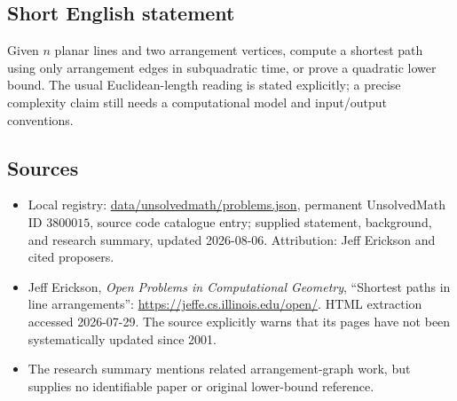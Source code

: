 \documentclass[11pt]{article}
\begin{document}
\subsection{Short English statement}
Given \(n\) planar lines and two arrangement vertices, compute a shortest path using only arrangement edges in subquadratic time, or prove a quadratic lower bound. The usual Euclidean-length reading is stated explicitly; a precise complexity claim still needs a computational model and input/output conventions.
\subsection{Sources}
\begin{itemize}
\item Local registry: \url{data/unsolvedmath/problems.json}, permanent UnsolvedMath ID \(3800015\), source code catalogue entry; supplied statement, background, and research summary, updated 2026-08-06. Attribution: Jeff Erickson and cited proposers.
\item Jeff Erickson, \emph{Open Problems in Computational Geometry}, ``Shortest paths in line arrangements'': \url{https://jeffe.cs.illinois.edu/open/}. HTML extraction accessed 2026-07-29. The source explicitly warns that its pages have not been systematically updated since 2001.
\item The research summary mentions related arrangement-graph work, but supplies no identifiable paper or original lower-bound reference.
\end{itemize}
\end{document}
